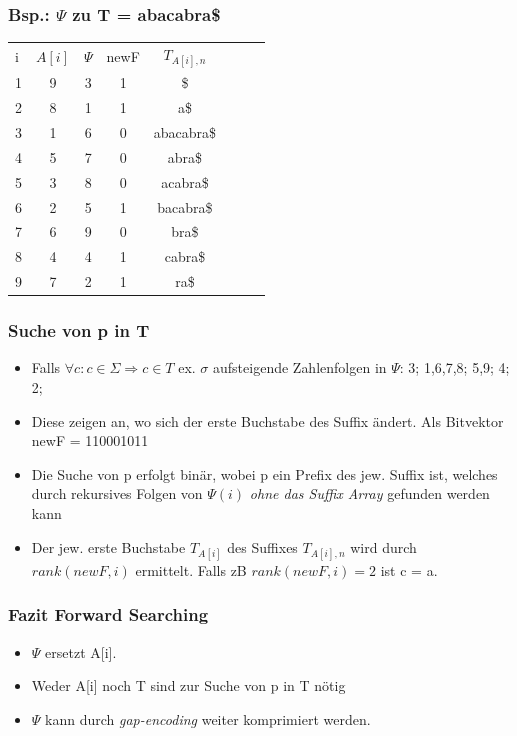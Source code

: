 \documentclass{beamer}
\begin{document}
\begin{frame}
\frametitle{Bsp.: $\Psi$ zu T = \glqq abacabra\$\grqq}
\begin{tabular}{l c cc ccc r}
i & $A[i]$ & $\Psi$ & newF & $T_{A[i],n}$ \\
1 & 9 & 3 & 1 &\$\\
2 & 8 & 1 & 1&a\$\\
3 & 1 & 6 & 0&abacabra\$\\
4 & 5 & 7 & 0&abra\$\\
5 & 3 & 8 & 0&acabra\$\\
6 & 2 & 5 & 1&bacabra\$\\
7 & 6 & 9 & 0&bra\$\\
8 & 4 & 4 & 1&cabra\$\\
9 & 7 & 2 & 1&ra\$\\
\end{tabular}
\end{frame}
\begin{frame}
\frametitle{Suche von p in T}
\begin{itemize}
\item Falls $\forall c: c \in \Sigma \Rightarrow c \in T$ ex. $\sigma$ aufsteigende Zahlenfolgen in $\Psi$: 3; 1,6,7,8; 5,9; 4; 2;
\item Diese zeigen an, wo sich der erste Buchstabe des Suffix ändert. Als Bitvektor newF = 110001011
\item Die Suche von p erfolgt binär, wobei p ein Prefix des jew. Suffix ist, welches durch rekursives Folgen von $\Psi(i)$ \textit{ohne das Suffix Array} gefunden werden kann
\item Der jew. erste Buchstabe $T_{A[i]}$ des Suffixes $T_{A[i],n}$ wird durch $rank(newF,i)$ ermittelt. Falls zB $rank(newF,i) = 2$ ist c = \glqq a\grqq.
\end{itemize}
\end{frame}
\begin{frame}
\frametitle{Fazit Forward Searching}
\begin{itemize}
\item $\Psi$ ersetzt A[i].
\item Weder A[i] noch T sind zur Suche von p in T nötig
\item $\Psi$ kann durch \textit{gap-encoding} weiter komprimiert werden.
\end{itemize}
\end{frame}
\end{document}
